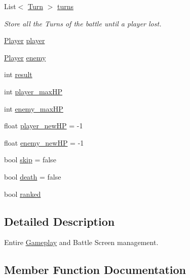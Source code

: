 \begin{DoxyCompactItemize}
List$<$ \mbox{\hyperlink{class_turn}{Turn}} $>$ \mbox{\hyperlink{class_gameplay_a835615e1b6b33c0340b1a6a00aff92ef}{turns}}
\begin{DoxyCompactList}\small\item\em Store all the Turns of the battle until a player lost. \end{DoxyCompactList}\item 
\mbox{\hyperlink{class_player}{Player}} \mbox{\hyperlink{class_gameplay_a08bd2fb4dd769dfdb90d4627da35728a}{player}}
\item 
\mbox{\hyperlink{class_player}{Player}} \mbox{\hyperlink{class_gameplay_a6879e0b49de984028dd0dae85873f20d}{enemy}}
\item 
int \mbox{\hyperlink{class_gameplay_afb9326f06082e04ed20c8c08bd3b323c}{result}}
\item 
int \mbox{\hyperlink{class_gameplay_a6a7bbaa555529ed618f3a699d9fba7da}{player\+\_\+max\+HP}}
\item 
int \mbox{\hyperlink{class_gameplay_a30cf1b38be25e93296e9e12d5b1c7a1a}{enemy\+\_\+max\+HP}}
\item 
float \mbox{\hyperlink{class_gameplay_ab6a745c63842b466d2089a7ee69f2504}{player\+\_\+new\+HP}} = -\/1
\item 
float \mbox{\hyperlink{class_gameplay_a64a0112ee42d349da1f4bf0e0876746f}{enemy\+\_\+new\+HP}} = -\/1
\item 
bool \mbox{\hyperlink{class_gameplay_a9218bbfcfe0c3e6392eef67514aa18eb}{skip}} = false
\item 
bool \mbox{\hyperlink{class_gameplay_ab4a9da65b37f32fe2ffd6edb5bc8c25b}{death}} = false
\item 
bool \mbox{\hyperlink{class_gameplay_adceff1461afda5b8b46381c99d315c51}{ranked}}
\end{DoxyCompactItemize}


\subsection{Detailed Description}
Entire \mbox{\hyperlink{class_gameplay}{Gameplay}} and Battle Screen management. 

\subsection{Member Function Documentation}
\mbox{\label{class_gameplay_a0d0ef2766c769e58dbd93b3467a40d0b}} 
